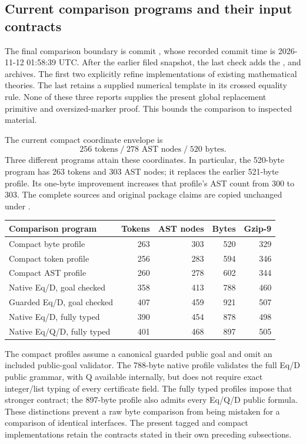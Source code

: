 \subsection{Current comparison programs and their input contracts}

The final comparison boundary is commit
, whose recorded commit time is
2026-11-12 01:58:39 UTC. After the earlier filed snapshot, the last check
adds the ,  and
 archives. The first two explicitly refine
implementations of existing mathematical theories. The last retains a
supplied numerical template in its crossed equality rule. None of these
three reports supplies the present global replacement primitive and
oversized-marker proof. This bounds the comparison to inspected material.

The current compact coordinate envelope is
\[
            256\text{ tokens}\;/\;278\text{ AST nodes}\;/\;520\text{ bytes}.
\]
Three different programs attain these coordinates. In particular, the
520-byte program has 263 tokens and 303 AST nodes; it replaces the earlier
521-byte profile. Its one-byte improvement increases that profile's AST
count from 300 to 303. The complete sources and original package claims
are copied unchanged under .

\begin{center}
\small
\begin{tabular}{lrrrr}
\toprule
Comparison program & Tokens & AST nodes & Bytes & Gzip-9\\
\midrule
Compact byte profile & 263 & 303 & 520 & 329\\
Compact token profile & 256 & 283 & 594 & 346\\
Compact AST profile & 260 & 278 & 602 & 344\\
Native Eq/D, goal checked & 358 & 413 & 788 & 460\\
Guarded Eq/D, goal checked & 407 & 459 & 921 & 507\\
Native Eq/D, fully typed & 390 & 454 & 878 & 498\\
Native Eq/Q/D, fully typed & 401 & 468 & 897 & 505\\
\bottomrule
\end{tabular}
\end{center}

The compact profiles assume a canonical guarded public goal and omit an
included public-goal validator. The 788-byte native profile validates
the full Eq/D public grammar, with Q available internally, but does not
require exact integer/list typing of every certificate field. The
fully typed profiles impose that stronger contract; the 897-byte profile
also admits every Eq/Q/D public formula. These distinctions prevent a
raw byte comparison from being mistaken for a comparison of identical
interfaces. The present tagged and compact implementations retain the
contracts stated in their own preceding subsections.

